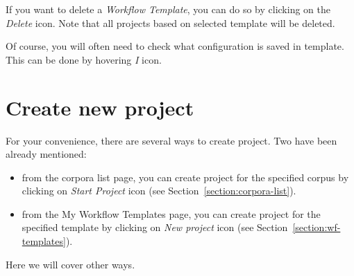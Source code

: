 If you want to delete a \emph{Workflow Template}, you can do so by clicking on
the \emph{Delete} icon. Note that all projects based on selected template will
be deleted.

Of course, you will often need to check what configuration is saved in template.
This can be done by hovering \emph{I} icon.

\section{Create new project}\label{section:create-new-project}

For your convenience, there are several ways to create project.
Two have been already mentioned:
 \begin{itemize}
   \item from the corpora list page, you can create project for the specified
corpus by clicking on \emph{Start Project} icon (see
Section~\ref{section:corpora-list}).
   \item from the My Workflow Templates page, you can create project for the
specified template by clicking on \emph{New project} icon (see
Section~\ref{section:wf-templates}).
 \end{itemize}
 
 Here we will cover other ways.
 
